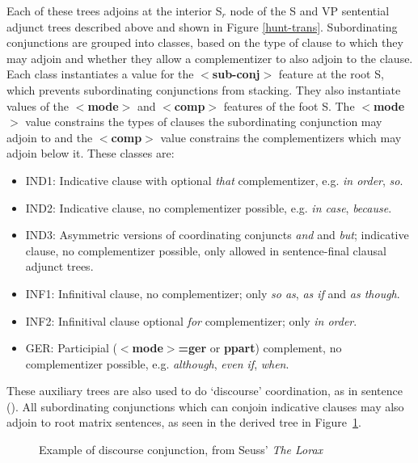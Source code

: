 Each of these trees adjoins at the interior S$_r$ node of the S and VP
sentential adjunct trees described above and shown in Figure \ref{hunt-trans}.
Subordinating conjunctions are grouped into classes, based on the type of
clause to which they may adjoin and whether they allow a complementizer to also
adjoin to the clause.  Each class instantiates a value for the {\bf
$<$sub-conj$>$} feature at the root S, which prevents subordinating
conjunctions from stacking.  They also instantiate values of the {\bf
$<$mode$>$} and {\bf $<$comp$>$} features of the foot S.  The {\bf $<$mode$>$}
value constrains the types of clauses the subordinating conjunction may adjoin
to and the {\bf $<$comp$>$} value constrains the complementizers which may
adjoin below it.  These classes are:

\begin{itemize}
\item IND1: Indicative clause with optional {\it that} complementizer,
e.g. {\it in order}, {\it so}.
\item IND2: Indicative clause, no complementizer possible, e.g. {\it
in case}, {\it because}.
\item IND3: Asymmetric versions of coordinating conjuncts {\it and}
and {\it but}; indicative clause, no complementizer possible, only
allowed in sentence-final clausal adjunct trees.
\item INF1: Infinitival clause, no complementizer; only {\it so as}, {\it
as if} and {\it as though}.
\item INF2: Infinitival clause optional {\it for} complementizer; only {\it
in order}.
\item GER: Participial ({\bf $<$mode$>$=ger} or {\bf ppart}) complement, no
complementizer possible, e.g. {\it although}, {\it even if}, {\it
when}. 
\end{itemize}

These auxiliary trees are also used to do `discourse' coordination, as in
sentence ().  All subordinating conjunctions which can conjoin indicative
clauses may also adjoin to root matrix sentences, as seen in the derived tree
in Figure~\ref{seuss-sentence}.


\begin{figure}[htb]
\centering
\hspace{0in}
\caption{Example of discourse conjunction, from Seuss' {\it The
Lorax}\nocite{seuss71}}
\label{seuss-sentence}
\end{figure}






